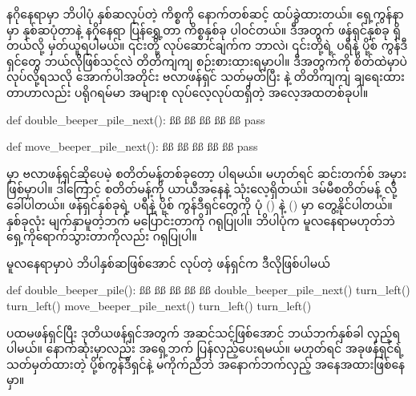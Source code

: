  နဂိုနေရာမှာ ဘိပါပုံ နှစ်ဆလုပ်တဲ့ ကိစ္စကို နောက်တစ်ဆင့် ထပ်ခွဲထားတယ်။ ရှေ့ကွန်နာမှာ နှစ်ဆပုံတာနဲ့ နဂိုနေရာ ပြန်ရွှေ့တာ ကိစ္စနှစ်ခု ပါဝင်တယ်။ ဒီအတွက် ဖန်ရှင်နှစ်ခု ရှိတယ်လို့ မှတ်ယူရပါမယ်။ ၎င်းတို့ လုပ်ဆောင်ချက်က ဘာလဲ၊ ၎င်းတို့ရဲ့ ပရီနဲ့ ပို့စ် ကွန်ဒီရှင်တွေ ဘယ်လိုဖြစ်သင့်လဲ တိတိကျကျ စဉ်းစားထားရမှာပါ။ ဒီအတွက်ကို စိတ်ထဲမှာပဲ လုပ်လို့ရသလို အောက်ပါအတိုင်း ဗလာဖန်ရှင်  သတ်မှတ်ပြီး  နဲ့ တိတိကျကျ ချရေးထားတာဟာလည်း ပရိုဂရမ်မာ အများစု လုပ်လေ့လုပ်ထရှိတဲ့ အလေ့အထတစ်ခုပါ။
 
%
\begin{py}
def double_beeper_pile_next():
    ßß
    ßß
    ßß
    ßß
    ßß
    pass
\end{py}
%
%
\begin{py}
def move_beeper_pile_next():
    ßß
    ßß
    ßß
    ßß
    ßß
    pass
\end{py}
%
 မှာ ဗလာဖန်ရှင်ဆိုပေမဲ့ စတိတ်မန့်တစ်ခုတော့ ပါရမယ်။ မဟုတ်ရင် ဆင်းတက်စ် အမှားဖြစ်မှာပါ။ ဒါကြောင့်  စတိတ်မန့်ကို ယာယီအနေနဲ့ သုံးလေ့ရှိတယ်။ ဒမ်မီစတိတ်မန့်   လို့ ခေါ်ပါတယ်။ ဖန်ရှင်နှစ်ခုရဲ့ ပရီနဲ့ ပို့စ် ကွန်ဒီရှင်တွေကို ပုံ (\fRefNo{\ref{fig:dbpnxt12}}) နဲ့ (\fRefNo{\ref{fig:mbpnxt12}}) မှာ တွေ့နိုင်ပါတယ်။ နှစ်ခုလုံး မျက်နှာမူတဲ့ဘက် မပြောင်းတာကို ဂရုပြုပါ။ ဘိပါပုံက မူလနေရာမဟုတ်ဘဲ ရှေ့ကိုရောက်သွားတာကိုလည်း ဂရုပြုပါ။

မူလနေရာမှာပဲ ဘိပါနှစ်ဆဖြစ်အောင် လုပ်တဲ့ ဖန်ရှင်က ဒီလိုဖြစ်ပါမယ်
%
\begin{py}
def double_beeper_pile():
    ßß
    ßß
    ßß
    ßß
    ßß
    double_beeper_pile_next()
    turn_left()
    turn_left()
    move_beeper_pile_next()
    turn_left()
    turn_left()
\end{py}
%
ပထမဖန်ရှင်ပြီး ဒုတိယဖန်ရှင်အတွက် အဆင်သင့်ဖြစ်အောင် ဘယ်ဘက်နှစ်ခါ လှည့်ရပါမယ်။ နောက်ဆုံးမှာလည်း အရှေ့ဘက် ပြန်လှည့်ပေးရမယ်။ မဟုတ်ရင် အခုဖန်ရှင်ရဲ့ သတ်မှတ်ထားတဲ့ ပို့စ်ကွန်ဒီရှင်နဲ့ မကိုက်ညီဘဲ  အနောက်ဘက်လှည့် အနေအထားဖြစ်နေမှာ။


